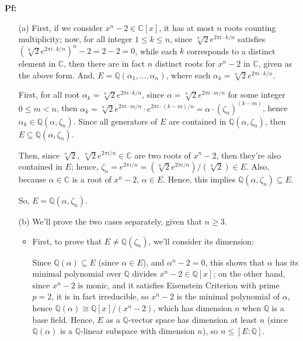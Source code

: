 \documentclass{article}
\begin{document}
\textbf{Pf:}

\begin{itemize}
    \item[(a)] First, if we consider $x^n-2\in\mathbb{C}[x]$, it has at most $n$ roots counting multiplicity; now, for all integer $1\leq k\leq n$,
    since $\sqrt[n]{2}e^{2\pi i\cdot k/n}$ satisfies $(\sqrt[n]{2}e^{2\pi i\cdot k/n})^n-2 = 2-2=0$, while each $k$ corresponds to a distinct element in $\mathbb{C}$,
    then there are in fact $n$ distinct roots for $x^n-2$ in $\mathbb{C}$, given as the above form. And, $E=\mathbb{Q}(\alpha_1,...,\alpha_n)$, where each $\alpha_k=\sqrt[n]{2}e^{2\pi i\cdot k/n}$.

    First, for all root $\alpha_k = \sqrt[n]{2}e^{2\pi i\cdot k/n}$, since $\alpha = \sqrt[n]{2}e^{2\pi i\cdot m/n}$ for some integer $0\leq m <n$, then $\alpha_k = \sqrt[n]{2}e^{2\pi i\cdot m/n}\cdot e^{2\pi i\cdot (k-m)/n} = \alpha\cdot (\zeta_n)^{(k-m)}$,
    hence $\alpha_k\in \mathbb{Q}(\alpha,\zeta_n)$. Since all generators of $E$ are contained in $\mathbb{Q}(\alpha,\zeta_n)$, then $E\subseteq \mathbb{Q}(\alpha,\zeta_n)$.

    Then, since $\sqrt[n]{2},\ \sqrt[n]{2}e^{2\pi i/n}\in\mathbb{C}$ are two roots of $x^n-2$, then they're also contained in $E$; hence, $\zeta_n = e^{2\pi i/n}=(\sqrt[n]{2}e^{2\pi i/n})/(\sqrt[n]{2})  \in E$.
    Also, because $\alpha\in\mathbb{C}$ is a root of $x^n-2$, $\alpha\in E$.
    Hence, this implies $\mathbb{Q}(\alpha,\zeta_n)\subseteq E$.

    So, $E=\mathbb{Q}(\alpha,\zeta_n)$.
    
    \hfil

    \item[(b)] We'll prove the two cases separately, given that $n\geq 3$.
    \begin{itemize}
        \item First, to prove that $E\neq \mathbb{Q}(\zeta_n)$, we'll consider its dimension: 
        
        Since $\mathbb{Q}(\alpha)\subseteq E$ (since $\alpha\in E$), and $\alpha^n-2=0$, this shows that $\alpha$ has its minimal polynomial over $\mathbb{Q}$ divides $x^n-2\in\mathbb{Q}[x]$; on the other hand, since $x^n-2$ is monic, and it satisfies Eisenstein Criterion with prime $p=2$,
        it is in fact irreducible, so $x^n-2$ is the minimal polynomial of $\alpha$, hence $\mathbb{Q}(\alpha)\cong \mathbb{Q}[x]/(x^n-2)$, which has dimension $n$ when $\mathbb{Q}$ is a base field.
        Hence, $E$ as a $\mathbb{Q}$-vector space has dimension at least $n$ (since $\mathbb{Q}(\alpha)$ is a $\mathbb{Q}$-linear subspace with dimension $n$), so $n \leq [E:\mathbb{Q}]$.


\end{itemize}
\end{itemize}
\end{document}
